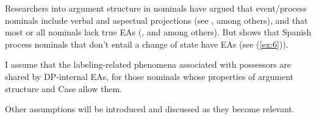 \documentclass[output=paper
,modfonts
,nonflat]{langsci/langscibook}
\begin{document}
\begin{figure}[!h]
\begin{exe}
\end{exe}
\end{figure}
\newpage \noindent Researchers into argument structure in nominals have argued that event/process nominals include verbal and aspectual projections (see \citealt{Hazout1995}, \citealt{Borer1993} among others), and that most or all nominals lack true EAs (\citealt{Alexiadou2001}, and \citealt{Picallo1991} among others). But \citet{Lopez2018} shows that Spanish process nominals that don’t entail a change of state have EAs (see (\ref{ex:6})).

I assume that the labeling-related phenomena associated with possessors are shared by DP-internal EAs, for those nominals whose properties of argument structure and Case allow them. 

Other assumptions will be introduced and discussed as they become relevant.
\end{document}
